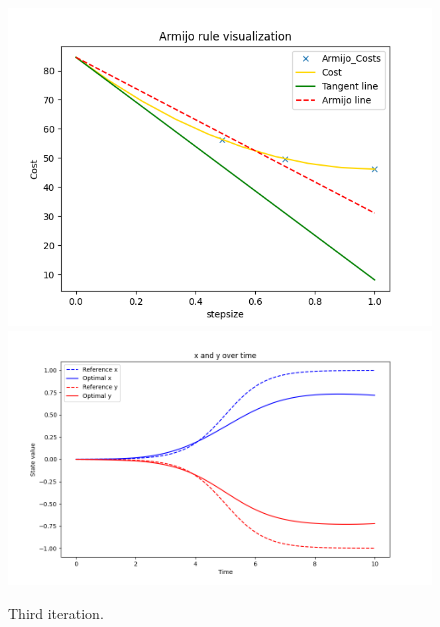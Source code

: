 \begin{figure}[H]
  \centering
  \includegraphics[width=1\textwidth]{pictures/Figure_2_1.png}\hfill \\
  \includegraphics[width=1\textwidth]{pictures/Figure_2_2.png}\hfill
  \caption{Third iteration.}
  \label{fig:Reference trajectory}
\end{figure}

